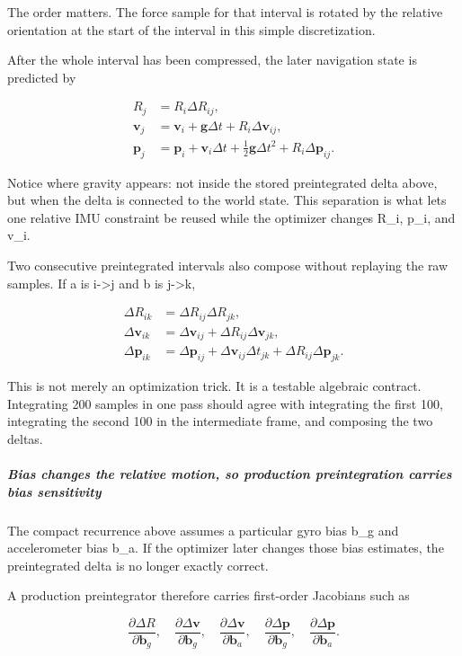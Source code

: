 The order matters. The force sample for that interval is rotated by the relative orientation at the start of the interval in this simple discretization.

After the whole interval has been compressed, the later navigation state is predicted by

\[
\begin{aligned}
R_j &= R_i\Delta R_{ij},\\
\mathbf v_j &= \mathbf v_i+\mathbf g\Delta t+R_i\Delta\mathbf v_{ij},\\
\mathbf p_j &= \mathbf p_i+\mathbf v_i\Delta t+\tfrac12\mathbf g\Delta t^2+R_i\Delta\mathbf p_{ij}.
\end{aligned}
\]

Notice where gravity appears: not inside the stored preintegrated delta above, but when the delta is connected to the world state. This separation is what lets one relative IMU constraint be reused while the optimizer changes R\_i, p\_i, and v\_i.

Two consecutive preintegrated intervals also compose without replaying the raw samples. If a is i-\textgreater j and b is j-\textgreater k,

\[
\begin{aligned}
\Delta R_{ik}&=\Delta R_{ij}\Delta R_{jk},\\
\Delta\mathbf v_{ik}&=\Delta\mathbf v_{ij}+\Delta R_{ij}\Delta\mathbf v_{jk},\\
\Delta\mathbf p_{ik}&=\Delta\mathbf p_{ij}+\Delta\mathbf v_{ij}\Delta t_{jk}+\Delta R_{ij}\Delta\mathbf p_{jk}.
\end{aligned}
\]

This is not merely an optimization trick. It is a testable algebraic contract. Integrating 200 samples in one pass should agree with integrating the first 100, integrating the second 100 in the intermediate frame, and composing the two deltas.

\subparagraph{Bias changes the relative motion, so production preintegration carries bias sensitivity}\label{bias-changes-the-relative-motion-so-production-preintegration-carries-bias-sensitivity}

The compact recurrence above assumes a particular gyro bias b\_g and accelerometer bias b\_a. If the optimizer later changes those bias estimates, the preintegrated delta is no longer exactly correct.

A production preintegrator therefore carries first-order Jacobians such as

\[
\frac{\partial\Delta R}{\partial\mathbf b_g},\quad
\frac{\partial\Delta\mathbf v}{\partial\mathbf b_g},\quad
\frac{\partial\Delta\mathbf v}{\partial\mathbf b_a},\quad
\frac{\partial\Delta\mathbf p}{\partial\mathbf b_g},\quad
\frac{\partial\Delta\mathbf p}{\partial\mathbf b_a}.
\]

